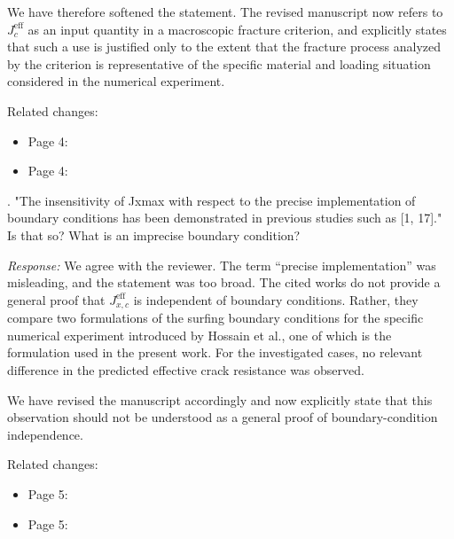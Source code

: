 \documentclass[pdflatex,sn-mathphys-num]{sn-jnl}
\begin{document}
We have therefore softened the statement. The revised manuscript now refers to $J_c^{\text{eff}}$ as an input quantity in a macroscopic fracture criterion, and explicitly states that such a use is justified only to the extent that the fracture process analyzed by the criterion is representative of the specific material and loading situation considered in the numerical experiment.

Related changes:
\begin{itemize}
\item Page 4:  
\item Page 4: 
\end{itemize}

\bigskip

. "The insensitivity of Jxmax with respect to the precise implementation of boundary conditions has been demonstrated in previous studies such as [1, 17]." Is that so? What is an imprecise boundary condition?

\emph{Response:} We agree with the reviewer. The term ``precise implementation'' was misleading, and the statement was too broad. The cited works do not provide a general proof that $J_{x,c}^{\text{eff}}$ is independent of boundary conditions. Rather, they compare two formulations of the surfing boundary conditions for the specific numerical experiment introduced by Hossain et al., one of which is the formulation used in the present work. For the investigated cases, no relevant difference in the predicted effective crack resistance was observed.

We have revised the manuscript accordingly and now explicitly state that this observation should not be understood as a general proof of boundary-condition independence.

Related changes:
\begin{itemize}
\item Page 5: 
\item Page 5: 
\end{itemize}
\end{document}
